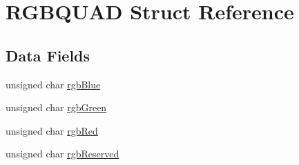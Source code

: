 \hypertarget{structRGBQUAD}{\section{R\+G\+B\+Q\+U\+A\+D Struct Reference}
\label{structRGBQUAD}
}
\subsection*{Data Fields}
\begin{DoxyCompactItemize}
\item 
unsigned char \hyperlink{structRGBQUAD_a26981c44b82baaabb9cdf9147c13b84b}{rgb\+Blue}
\item 
unsigned char \hyperlink{structRGBQUAD_abb80bcf0d8dd1a5b636aaa655017d1f9}{rgb\+Green}
\item 
unsigned char \hyperlink{structRGBQUAD_a1bd80a00a260953ea222a10b34035b0c}{rgb\+Red}
\item 
unsigned char \hyperlink{structRGBQUAD_aea0f944286f2e4ac1b21ca3f0e7328e5}{rgb\+Reserved}
\end{DoxyCompactItemize}


